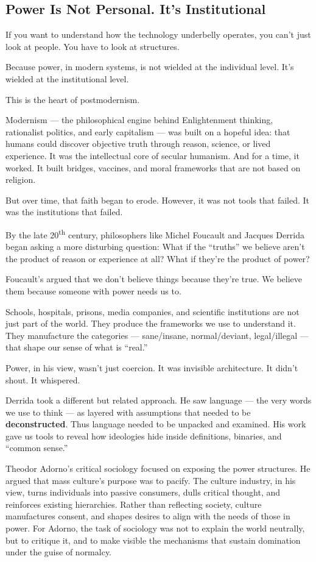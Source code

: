 \subsection{Power Is Not Personal. It’s Institutional}

If you want to understand how the technology underbelly operates, you can’t just look at people.  
You have to look at structures.

Because power, in modern systems, is not wielded at the individual level.  
It’s wielded at the institutional level.

This is the heart of postmodernism.

Modernism — the philosophical engine behind Enlightenment thinking, rationalist politics, and early capitalism — was built 
on a hopeful idea:  
that humans could discover objective truth through reason, science, or lived experience.  
It was the intellectual core of secular humanism.  
And for a time, it worked. It built bridges, vaccines, and moral frameworks that are not based on religion.

But over time, that faith began to erode. However, it was not tools that failed. It was the institutions that failed.

By the late 20\textsuperscript{th} century, philosophers like Michel Foucault and Jacques Derrida began asking a more 
disturbing question:  
What if the “truths” we believe aren’t the product of reason or experience at all?  
What if they’re the product of power?

Foucault’s argued that we don’t believe things because they’re true.  
We believe them because someone with power needs us to.

Schools, hospitals, prisons, media companies, and scientific institutions are not just part of the world.  
They produce the frameworks we use to understand it. They manufacture the categories --- sane/insane, normal/deviant, 
legal/illegal --- that shape our sense of what is “real.”

Power, in his view, wasn’t just coercion. It was invisible architecture.  
It didn’t shout. It whispered.

Derrida took a different but related approach.  
He saw language --- the very words we use to think --- as layered with assumptions that needed to be \textbf{deconstructed}.  
Thus language needed to be unpacked and examined.  
His work gave us tools to reveal how ideologies hide inside definitions, binaries, and ``common sense.''

Theodor Adorno’s critical sociology focused on exposing the power structures. He argued that mass culture's purpose was 
to pacify. The culture industry, in his view, turns individuals into passive consumers, dulls critical thought, and 
reinforces existing hierarchies. Rather than reflecting society, culture manufactures consent, and shapes desires to align 
with the needs of those in power. For Adorno, the task of sociology was not to explain the world neutrally, but to critique 
it, and to make visible the mechanisms that sustain domination under the guise of normalcy.

